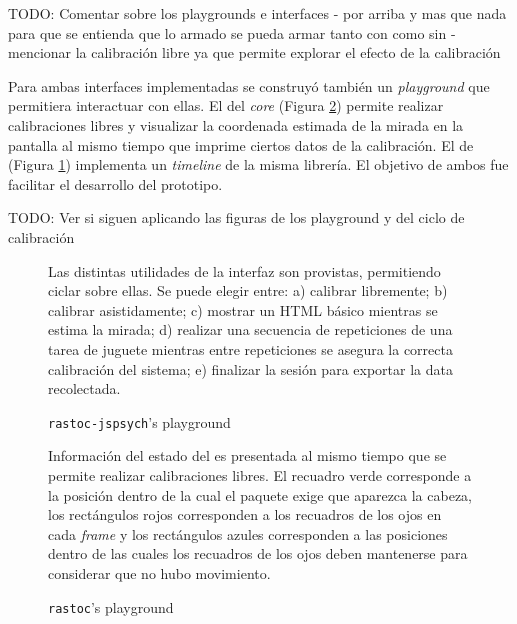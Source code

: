   TODO: Comentar sobre los playgrounds e interfaces
    - por arriba y mas que nada para que se entienda que lo armado se pueda armar
    tanto con como sin \jspsych
    - mencionar la calibración libre ya que permite explorar el efecto de la
    calibración

  Para ambas interfaces implementadas se construyó también un \textit{playground}
  que permitiera interactuar con ellas.
  El del \textit{core} (Figura \ref{fig:rastoc-playground}) permite realizar
  calibraciones libres y visualizar la coordenada estimada de la mirada en la
  pantalla al mismo tiempo que imprime ciertos datos de la calibración.
  El de \jspsych (Figura \ref{fig:rastoc-jspsych-playground}) implementa un
  \textit{timeline} de la misma librería.
  El objetivo de ambos fue facilitar el desarrollo del prototipo.

  TODO: Ver si siguen aplicando las figuras de los playground y del ciclo de calibración

  \begin{figure}
      \centering
      \caption{\texttt{rastoc-jspsych}’s playground}
      Las distintas utilidades de la interfaz \jspsych son provistas, permitiendo
      ciclar sobre ellas.
      Se puede elegir entre:
      a) calibrar libremente;
      b) calibrar asistidamente;
      c) mostrar un HTML básico mientras se estima la mirada;
      d) realizar una secuencia de repeticiones de una tarea de juguete mientras
      entre repeticiones se asegura la correcta calibración del sistema;
      e) finalizar la sesión para exportar la data recolectada.
      \label{fig:rastoc-jspsych-playground}
  \end{figure}

  \begin{figure}
      \centering
      \caption{\texttt{rastoc}’s playground}
      Información del estado del \eyetracker es presentada al mismo tiempo que se
      permite realizar calibraciones libres.
      El recuadro verde corresponde a la posición dentro de la cual el paquete
      \webgazer exige que aparezca la cabeza, los rectángulos rojos corresponden
      a los recuadros de los ojos en cada \textit{frame} y los rectángulos azules
      corresponden a las posiciones dentro de las cuales los recuadros de los
      ojos deben mantenerse para considerar que no hubo movimiento.
      \label{fig:rastoc-playground}
  \end{figure}

